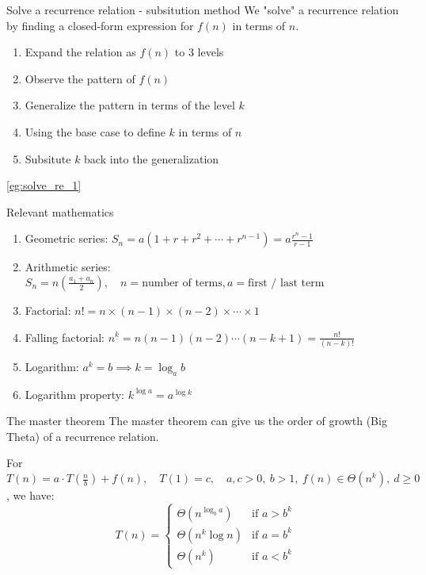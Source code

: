 \begin{theorem}
    {Solve a recurrence relation - subsitution method}
    We "solve" a recurrence relation by finding a closed-form expression for $f(n)$ in terms of $n$.
    \begin{enumerate}
        \item Expand the relation as $f(n)$ to 3 levels
        \item Observe the pattern of $f(n)$
        \item Generalize the pattern in terms of the level $k$
        \item Using the base case to define $k$ in terms of $n$
        \item Subsitute $k$ back into the generalization
    \end{enumerate}
    \tcblower
    \ref{eg:solve_re_1}
    \label{thm:solve_re}
\end{theorem}

\begin{knBox}
    {Relevant mathematics}
    \begin{enumerate}
        \item Geometric series: $S_n = a(1 + r + r^2 + \cdots + r^{n-1}) = a\frac{r^n - 1}{r-1}$
        \item Arithmetic series: $S_n = n(\frac{a_1+a_n}{2}),\quad n=\text{number of terms}, a=\text{first / last term}$
        \item Factorial: $n! = n \times (n-1) \times (n-2) \times \cdots \times 1$
        \item Falling factorial: $n^{\underline{k}} = n(n-1)(n-2)\cdots(n-k+1)=\frac{n!}{(n-k)!}$
        \item Logarithm: $a^k=b\implies k=\log_a b$
        \item Logarithm property: $k^{\log a} = a^{\log k}$
    \end{enumerate}
\end{knBox}

\begin{theorem}
    {The master theorem}
    The master theorem can give us the order of growth (Big Theta) of a recurrence relation.

    For $T(n) = a\cdot T(\frac{n}{b}) + f(n),\quad T(1) = c,\quad a, c > 0,\ b > 1,\ f(n)\in \Theta(n^k),\ d\geq 0$, we have:
    \[T(n) = \begin{cases}
            \Theta(n^{\log_b a}) & \text{if } a > b^k \\
            \Theta(n^k \log n)   & \text{if } a = b^k \\
            \Theta(n^k)          & \text{if } a < b^k
        \end{cases}\]
    \tcblower
    \label{thm:master_theorem}
\end{theorem}

